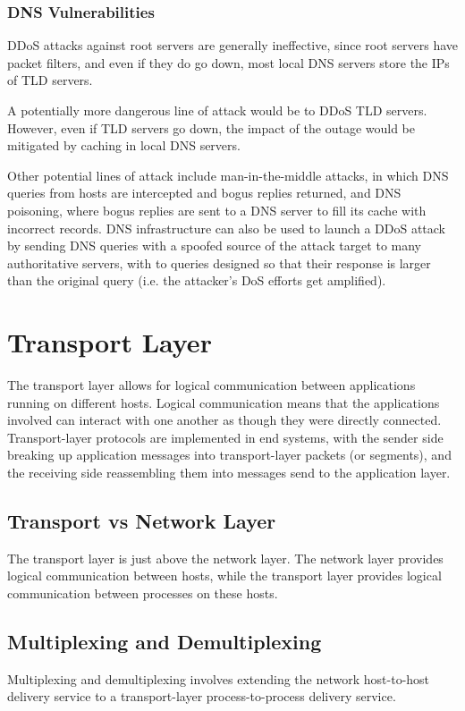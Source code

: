 \documentclass[12pt,titlepage]{article}
\begin{document}
    \subsubsection{DNS Vulnerabilities}
      DDoS attacks against root servers are generally ineffective, since root servers have packet filters, and even if they do go down, most local DNS servers store the IPs of
      TLD servers.

      A potentially more dangerous line of attack would be to DDoS TLD servers. However, even if TLD servers go down, the impact of the outage would be mitigated
      by caching in local DNS servers.

      Other potential lines of attack include man-in-the-middle attacks, in which DNS queries from hosts are intercepted and bogus replies returned,
      and DNS poisoning, where bogus replies are sent to a DNS server to fill its cache with incorrect records. DNS infrastructure can also be used to launch a DDoS attack by sending
      DNS queries with a spoofed source of the attack target to many authoritative servers, with to queries designed so that their response is larger than the original query (i.e. the
      attacker's DoS efforts get amplified).

  \section{Transport Layer}
    The transport layer allows for logical communication between applications running on different hosts. Logical communication means that the applications involved can interact with one
    another as though they were directly connected. Transport-layer protocols are implemented in end systems, with the sender side breaking up application messages into transport-layer
    packets (or segments), and the receiving side reassembling them into messages send to the application layer.

    \subsection{Transport vs Network Layer}
      The transport layer is just above the network layer. The network layer provides logical communication between hosts, while the transport layer provides logical communication between
      processes on these hosts.

    \subsection{Multiplexing and Demultiplexing}
      Multiplexing and demultiplexing involves extending the network host-to-host delivery service to a transport-layer process-to-process delivery service.
\end{document}

